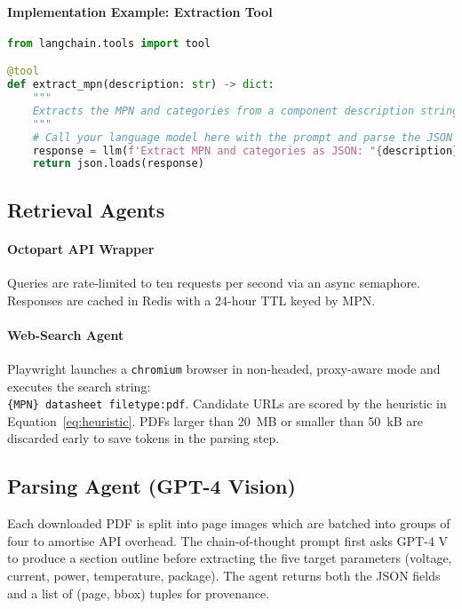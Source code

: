 \paragraph{Implementation Example: Extraction Tool}
\begin{lstlisting}[language=Python]
from langchain.tools import tool

@tool
def extract_mpn(description: str) -> dict:
    """
    Extracts the MPN and categories from a component description string.
    """
    # Call your language model here with the prompt and parse the JSON output
    response = llm(f'Extract MPN and categories as JSON: "{description}"')
    return json.loads(response)
\end{lstlisting}

\subsection{Retrieval Agents}
\paragraph{Octopart API Wrapper}  Queries are rate-limited to ten requests per second via an async semaphore.  Responses are cached in Redis with a 24-hour TTL keyed by MPN.

\paragraph{Web-Search Agent}  Playwright launches a \texttt{chromium} browser in non-headed, proxy-aware mode and executes the search string:\\
\texttt{\{MPN\} datasheet filetype:pdf}.  Candidate URLs are scored by the heuristic in Equation~\ref{eq:heuristic}.  PDFs larger than 20~MB or smaller than 50~kB are discarded early to save tokens in the parsing step.

\subsection{Parsing Agent (GPT-4 Vision)}
Each downloaded PDF is split into page images which are batched into groups of four to amortise API overhead.  The chain-of-thought prompt first asks GPT-4 V to produce a section outline before extracting the five target parameters (voltage, current, power, temperature, package).  The agent returns both the JSON fields and a list of (page, bbox) tuples for provenance.

